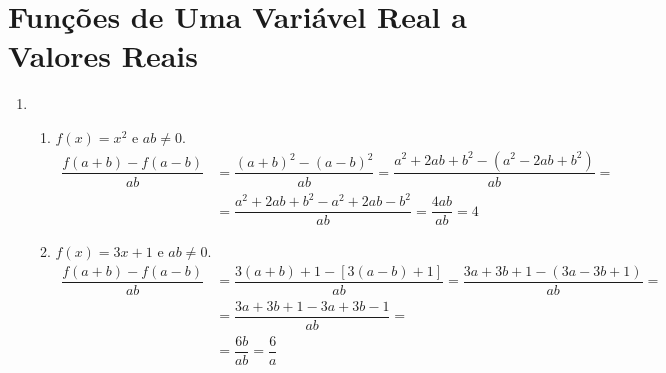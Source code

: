 \section{Funções de Uma Variável Real a Valores Reais}
\begin{enumerate}
\item %
	\begin{enumerate}
		\addtocounter{enumii}{2}
		\item %
			$f(x)=x^2$ e $ab \neq 0$.
		\begin{equation*}
		\begin{split}
			\dfrac{f(a+b)-f(a-b)}{ab} &= \dfrac{(a+b)^2-(a-b)^2}{ab} = \dfrac{a^2+2ab+b^2-(a^2-2ab+b^2)}{ab} = \\ 
			&=\dfrac{a^2+2ab+b^2-a^2+2ab-b^2}{ab}=\dfrac{4ab}{ab}=4
		\end{split}
		\end{equation*}
		\item %
		$f(x)=3x+1$ e $ab\neq 0$.\\
		\begin{equation*}
		\begin{split}
		\dfrac{f(a+b)-f(a-b)}{ab}&= \dfrac{3(a+b)+1-[3(a-b)+1]}{ab}=\dfrac{3a+3b+1-(3a-3b+1)}{ab}=\\
								  &= \dfrac{3a+3b+1-3a+3b-1}{ab}=\\
								  &= \dfrac{6b}{ab}=\dfrac{6}{a}
		\end{split}
		\end{equation*}
		

\end{enumerate}
\end{enumerate}
